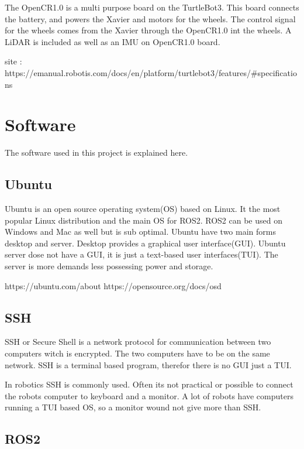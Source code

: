 The OpenCR1.0 is a multi purpose board on the TurtleBot3. This board connects the battery, and powers the Xavier and motors for the wheels. The control signal for the wheels comes from the Xavier through the OpenCR1.0 int the wheels. 
A LiDAR is included as well as an IMU on OpenCR1.0 board.

site : 
https://emanual.robotis.com/docs/en/platform/turtlebot3/features/#specifications

\subsection{}

\section{Software}

The software used in this project is explained here. 

\subsection{Ubuntu}

Ubuntu is an open source operating system(OS) based on Linux. It the most popular Linux distribution and the main OS for ROS2. ROS2 can be used on Windows and Mac as well but is sub optimal. Ubuntu have two main forms desktop and server. Desktop provides a graphical user interface(GUI). Ubuntu server dose not have a GUI, it is just a text-based user interfaces(TUI). The server is more demands less possessing power and storage. 

https://ubuntu.com/about
https://opensource.org/docs/osd 

\subsection{SSH}

SSH or Secure Shell is a network protocol for communication between two computers witch is encrypted. The two computers have to be on the same network. SSH is a terminal based program, therefor there is no GUI just a TUI. 

In robotics SSH is commonly used. Often its not practical or possible to connect the robots computer to keyboard and a monitor. A lot of robots have computers running a TUI based OS, so a monitor wound not give more than SSH. 

\subsection{ROS2}

